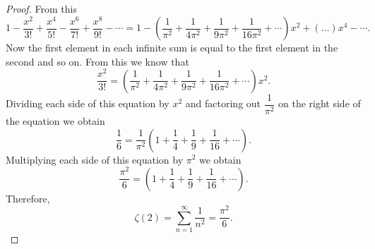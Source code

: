 \documentclass[12pt]{article}
\begin{document}
\begin{doublespace}
\begin{proof}
%
From this 
\[1-\frac{x^2}{3!}+\frac{x^4}{5!}-\frac{x^6}{7!}+\frac{x^8}{9!}-\cdots = 1 - \left( \frac{1}{\pi^2} + \frac{1}{4\pi^2} + \frac{1}{9\pi^2} + \frac{1}{16\pi^2} + \cdots \right)x^2 + \left(\dots\right)x^4-\cdots.\]
Now the first element in each infinite sum is equal to the first element in the second and so on. From this we know that
\[\frac{x^2}{3!} =  \left( \frac{1}{\pi^2} + \frac{1}{4\pi^2} + \frac{1}{9\pi^2} + \frac{1}{16\pi^2} + \cdots \right)x^2.\]
Dividing each side of this equation by $x^2$ and factoring out $\dfrac{1}{\pi^2}$ on the right side of the equation we obtain
\[\frac{1}{6} = \frac{1}{\pi^2}\left( 1 + \frac{1}{4} + \frac{1}{9} + \frac{1}{16} + \cdots \right).\]
Multiplying each side of this equation by $\pi^2$ we obtain
\[\frac{\pi^2}{6} = \left( 1 + \frac{1}{4} + \frac{1}{9} + \frac{1}{16} + \cdots \right).\]
Therefore,
\[\zeta \left({2}\right) = \sum\limits_{n=1}^\infty \frac{1}{n^2} = \frac{\pi^2}{6}.\]
\end{proof}\cite{basel}
\end{doublespace}



\end{document}
